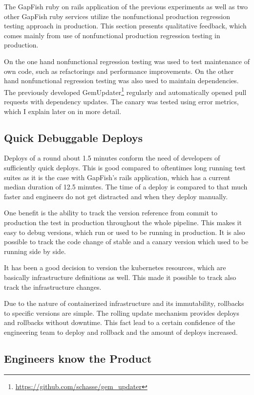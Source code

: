 The GapFish ruby on rails application of the previous experiments as well as two other
GapFish ruby services utilize the nonfunctional production regression testing approach in
production. This section presents qualitative feedback, which comes mainly from use of
nonfunctional production regression testing in production.

On the one hand nonfunctional regression testing was used to test maintenance of own code,
such as refactorings and performance improvements. On the other hand nonfunctional
regression testing was also used to maintain dependencies. The previously developed
GemUpdater\footnote{\url{https://github.com/schasse/gem_updater}} regularly and
automatically opened pull requests with dependency updates. The canary was tested using
error metrics, which I explain later on in more detail.

\subsection{Quick Debuggable Deploys}

Deploys of a round about 1.5 minutes conform the need of developers of sufficiently quick
deploys. This is good compared to oftentimes long running test suites as it is the case with
GapFish's rails application, which has a current median duration of 12.5 minutes. The time
of a deploy is compared to that much faster and engineers do not get distracted and when
they deploy manually.

One benefit is the ability to track the version reference from commit to production the
test in production throughout the whole pipeline. This makes it easy to debug versions,
which run or used to be running in production. It is also possible to track the code
change of stable and a canary version which used to be running side by side.

It has been a good decision to version the kubernetes resources, which are basically
infrastructure definitions as well. This made it possible to track also track the
infrastructure changes.

Due to the nature of containerized infrastructure and its immutability, rollbacks to
specific versions are simple. The rolling update mechanism provides deploys and rollbacks
without downtime. This fact lead to a certain confidence of the engineering team to deploy
and rollback and the amount of deploys increased.

\subsection{Engineers know the Product}

